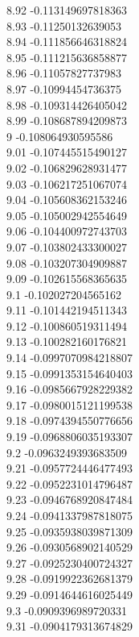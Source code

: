 {8.92	-0.113149697818363\\
8.93	-0.11250132639053\\
8.94	-0.111856646318824\\
8.95	-0.111215636858877\\
8.96	-0.11057827737983\\
8.97	-0.10994454736375\\
8.98	-0.109314426405042\\
8.99	-0.108687894209873\\
9	-0.108064930595586\\
9.01	-0.107445515490127\\
9.02	-0.106829628931477\\
9.03	-0.106217251067074\\
9.04	-0.105608362153246\\
9.05	-0.105002942554649\\
9.06	-0.104400972743703\\
9.07	-0.103802433300027\\
9.08	-0.103207304909887\\
9.09	-0.102615568365635\\
9.1	-0.102027204565162\\
9.11	-0.101442194511343\\
9.12	-0.100860519311494\\
9.13	-0.100282160176821\\
9.14	-0.0997070984218807\\
9.15	-0.0991353154640403\\
9.16	-0.0985667928229382\\
9.17	-0.0980015121199538\\
9.18	-0.0974394550776656\\
9.19	-0.0968806035193307\\
9.2	-0.0963249393683509\\
9.21	-0.0957724446477493\\
9.22	-0.0952231014796487\\
9.23	-0.0946768920847484\\
9.24	-0.0941337987818075\\
9.25	-0.0935938039871309\\
9.26	-0.0930568902140529\\
9.27	-0.0925230400724327\\
9.28	-0.0919922362681379\\
9.29	-0.0914644616025449\\
9.3	-0.0909396989720331\\
9.31	-0.0904179313674829\\
}
